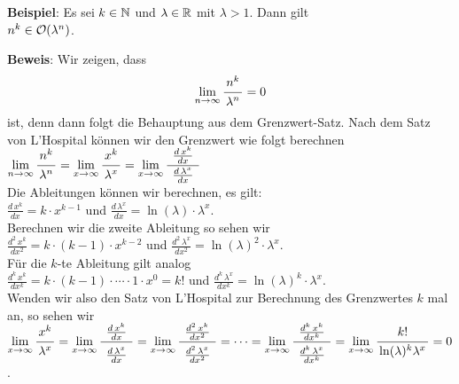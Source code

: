 \noindent
\textbf{Beispiel}: Es sei $k \in {\mathbb N}$ und $\lambda \in {\mathbb R}$ mit $\lambda > 1$.  Dann gilt\\[0.1cm]
\hspace*{1.3cm} $n^k \in \mathcal{O}(\lambda^n)$.
\vspace*{0.3cm}

\noindent
\textbf{Beweis}: Wir zeigen, dass 
\hspace*{1.3cm} 
\begin{equation}
  \label{eq:star}
  \lim\limits_{n \rightarrow \infty} \bruch{n^{k}}{\lambda^n} = 0  
\end{equation}
ist, denn dann folgt die Behauptung aus dem Grenzwert-Satz. 
Nach dem Satz von L'Hospital k\"onnen wir den Grenzwert wie folgt berechnen \\[0.1cm]
\hspace*{1.3cm} 
$\displaystyle \lim\limits_{n \rightarrow \infty} \bruch{n^{k}}{\lambda^n} =
\lim\limits_{x \rightarrow \infty} \bruch{x^{k}}{\lambda^x} =
\lim\limits_{x \rightarrow \infty} \bruch{\;\frac{d\,x^{k}}{dx}\;}{\frac{d\,\lambda^x}{dx}}$
\\[0.1cm]
Die Ableitungen  k\"onnen wir berechnen, es gilt: \\[0.1cm]
\hspace*{1.3cm}
 $\displaystyle \frac{d\,x^{k}}{dx} = k \cdot x^{k-1}$ \quad und \quad 
 $\displaystyle \frac{d\,\lambda^{x}}{dx} = \ln(\lambda) \cdot \lambda^x$. \\[0.1cm]
Berechnen wir die zweite Ableitung so sehen wir \\[0.1cm]
\hspace*{1.3cm}  
$\displaystyle \frac{d^{2}\,x^{k}}{dx^2} = k \cdot (k-1) \cdot x^{k-2}$ \quad und \quad 
 $\displaystyle \frac{d^2\,\lambda^{x}}{dx^2} = \ln(\lambda)^2 \cdot \lambda^x$. \\[0.1cm]
F\"ur die $k$-te Ableitung gilt analog \\[0.1cm]
\hspace*{1.3cm} 
$\displaystyle \frac{d^{k}\,x^{k}}{dx^k} = k \cdot (k-1) \cdot \cdots \cdot 1 \cdot x^{0} = k!$ \quad und \quad 
 $\displaystyle \frac{d^k\,\lambda^{x}}{dx^k} = \ln(\lambda)^k \cdot \lambda^x$. \\[0.1cm]
Wenden wir also den Satz von L'Hospital zur Berechnung des Grenzwertes  $k$ mal an, so
sehen wir \\[0.1cm]
\hspace*{1.3cm} 
$\displaystyle 
\lim\limits_{x \rightarrow \infty} \bruch{x^{k}}{\lambda^x} =
\lim\limits_{x \rightarrow \infty} \bruch{\rule[-10pt]{0pt}{10pt}\;\frac{d\,x^{k}}{dx}\;}{\rule{0pt}{12pt}\frac{d\,\lambda^x}{dx}} =
\lim\limits_{x \rightarrow \infty} \bruch{\rule[-10pt]{0pt}{10pt}\;\frac{d^2\,x^{k}}{dx^2}\;}{\rule{0pt}{12pt}\frac{d^2\,\lambda^x}{dx^2}} =
\cdots = 
\lim\limits_{x \rightarrow \infty} \bruch{\rule[-10pt]{0pt}{10pt}\;\frac{d^k\,x^{k}}{dx^k}\;}{\rule{0pt}{12pt}\frac{d^k\,\lambda^x}{dx^k}} =
\lim\limits_{x \rightarrow \infty} \bruch{k!}{\ln(\lambda)^k \lambda^x} = 0$.

